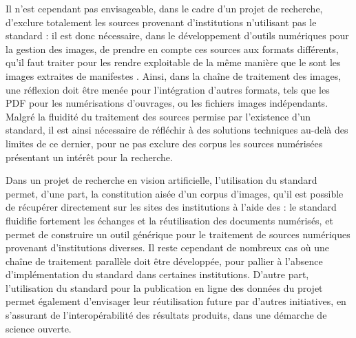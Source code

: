 	Il n'est cependant pas envisageable, dans le cadre d'un projet de recherche, d'exclure totalement les sources provenant d'institutions n'utilisant pas le standard \iiif : il est donc nécessaire, dans le développement d'outils numériques pour la gestion des images, de prendre en compte ces sources aux formats différents, qu'il faut traiter pour les rendre exploitable de la même manière que le sont les images extraites de manifestes \iiif. Ainsi, dans la chaîne de traitement des images, une réflexion doit être menée pour l'intégration d'autres formats, tels que les PDF pour les numérisations d'ouvrages, ou les fichiers images indépendants. Malgré la fluidité du traitement des sources permise par l'existence d'un standard, il est ainsi nécessaire de réfléchir à des solutions techniques au-delà des limites de ce dernier, pour ne pas exclure des corpus les sources numérisées présentant un intérêt pour la recherche. 
	
	Dans un projet de recherche en vision artificielle, l'utilisation du standard \iiif permet, d'une part, la constitution aisée d'un corpus d'images, qu'il est possible de récupérer directement sur les sites des institutions à l'aide des \api : le standard \iiif fluidifie fortement les échanges et la réutilisation des documents numérisés, et permet de construire un outil générique pour le traitement de sources numériques provenant d'institutions diverses. Il reste cependant de nombreux cas où une chaîne de traitement parallèle doit être développée, pour pallier à l'absence d'implémentation du standard dans certaines institutions. D'autre part, l'utilisation du standard \iiif pour la publication en ligne des données du projet permet également d'envisager leur réutilisation future par d'autres initiatives, en s'assurant de l'interopérabilité des résultats produits, dans une démarche de science ouverte.
